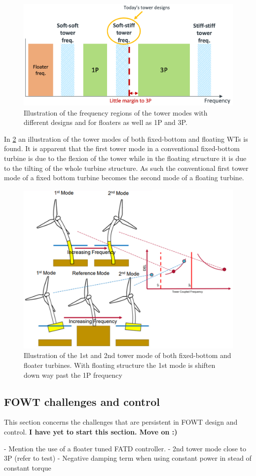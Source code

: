 \begin{figure}[ht]
	\centering
	\includegraphics[width=0.7\linewidth]{Graphics/1Pand3PvsTwrStiff.PNG}
	\caption{Illustration of the frequency regions of the tower modes with different designs and for floaters as well as 1P and 3P.}
	\label{fig:1p_and3p}
\end{figure}
In \cref{fig:eigen_and_1p3p} an illustration of the tower modes of both fixed-bottom and floating WTs is found. It is apparent that the first tower mode in a conventional fixed-bottom turbine is due to the flexion of the tower while in the floating structure it is due to the tilting of the whole turbine structure. As such the conventional first tower mode of a fixed bottom turbine becomes the second mode of a floating turbine.
\begin{figure}[ht]
	\centering
	\includegraphics[width=0.7\linewidth]{Graphics/1P3PandEigenFloater.png}
	\caption{Illustration of the 1st and 2nd tower mode of both fixed-bottom and floater turbines. With floating structure the 1st mode is shiften down way past the 1P frequency}
	\label{fig:eigen_and_1p3p}
\end{figure}


\subsection{FOWT challenges and control} \label{sec:theo_fowt_challenges}
This section concerns the challenges that are persistent in FOWT design and control. \textbf{I have yet to start this section. Move on :)}



- Mention the use of a floater tuned FATD controller.
- 2nd tower mode close to 3P (refer to test)
- Negative damping term when using constant power in stead of constant torque

